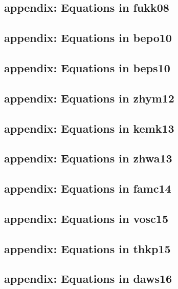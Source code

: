 \subsection{appendix: Equations in fukk08\label{ve_fukk08}} 

\newpage
\subsection{appendix: Equations in bepo10\label{ve_bepo10}} 

\newpage
\subsection{appendix: Equations in beps10\label{ve_beps10}} 

\newpage
\subsection{appendix: Equations in zhym12\label{ve_zhym12}} 

\newpage
\subsection{appendix: Equations in kemk13\label{ve_kemk13}} 

\newpage
\subsection{appendix: Equations in zhwa13\label{ve_zhwa13}} 

\newpage
\subsection{appendix: Equations in famc14\label{ve_famc14}} 

\newpage
\subsection{appendix: Equations in vosc15\label{ve_vosc15}} 

\newpage
\subsection{appendix: Equations in thkp15\label{ve_thkp15}} 

\newpage
\subsection{appendix: Equations in daws16\label{ve_daws16}} 

